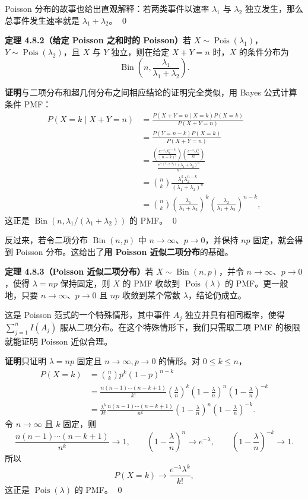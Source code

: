 \documentclass[UTF8,12pt,a4paper,fontset=fandol]{ctexart}
\begin{document}
Poisson 分布的故事也给出直观解释：若两类事件以速率 $\lambda_1$ 与 $\lambda_2$ 独立发生，那么总事件发生速率就是 $\lambda_1+\lambda_2$。 \qed

\noindent\textbf{定理 4.8.2（给定 Poisson 之和时的 Poisson）}\quad 若 $X\sim\operatorname{Pois}(\lambda_1)$，$Y\sim\operatorname{Pois}(\lambda_2)$，且 $X$ 与 $Y$ 独立，则在给定 $X+Y=n$ 时，$X$ 的条件分布为
\[
  \operatorname{Bin}\left(n,\frac{\lambda_1}{\lambda_1+\lambda_2}\right).
\]

\noindent\textbf{证明}\quad 与二项分布和超几何分布之间相应结论的证明完全类似，用 Bayes 公式计算条件 PMF：
\[
\begin{aligned}
  P(X=k\mid X+Y=n)
  &=\frac{P(X+Y=n\mid X=k)P(X=k)}{P(X+Y=n)}\\
  &=\frac{P(Y=n-k)P(X=k)}{P(X+Y=n)}\\
  &=\frac{\left(\frac{e^{-\lambda_2}\lambda_2^{n-k}}{(n-k)!}\right)
    \left(\frac{e^{-\lambda_1}\lambda_1^k}{k!}\right)}
    {\frac{e^{-(\lambda_1+\lambda_2)}(\lambda_1+\lambda_2)^n}{n!}}\\
  &=\binom{n}{k}\frac{\lambda_1^k\lambda_2^{n-k}}{(\lambda_1+\lambda_2)^n}\\
  &=\binom{n}{k}
    \left(\frac{\lambda_1}{\lambda_1+\lambda_2}\right)^k
    \left(\frac{\lambda_2}{\lambda_1+\lambda_2}\right)^{n-k},
\end{aligned}
\]
这正是 $\operatorname{Bin}(n,\lambda_1/(\lambda_1+\lambda_2))$ 的 PMF。 \qed

反过来，若令二项分布 $\operatorname{Bin}(n,p)$ 中 $n\to\infty$、$p\to 0$，并保持 $np$ 固定，就会得到 Poisson 分布。这给出了\textbf{用 Poisson 近似二项分布}的基础。

\noindent\textbf{定理 4.8.3（Poisson 近似二项分布）}\quad 若 $X\sim\operatorname{Bin}(n,p)$，并令 $n\to\infty$、$p\to 0$，使得 $\lambda=np$ 保持固定，则 $X$ 的 PMF 收敛到 $\operatorname{Pois}(\lambda)$ 的 PMF。更一般地，只要 $n\to\infty$、$p\to 0$ 且 $np$ 收敛到某个常数 $\lambda$，结论仍成立。

这是 Poisson 范式的一个特殊情形，其中事件 $A_j$ 独立并具有相同概率，使得 $\sum_{j=1}^n I(A_j)$ 服从二项分布。在这个特殊情形下，我们只需取二项 PMF 的极限就能证明 Poisson 近似合理。

\noindent\textbf{证明}\quad 只证明 $\lambda=np$ 固定且 $n\to\infty,p\to 0$ 的情形。对 $0\le k\le n$，
\[
\begin{aligned}
  P(X=k)
  &=\binom{n}{k}p^k(1-p)^{n-k}\\
  &=\frac{n(n-1)\cdots(n-k+1)}{k!}
    \left(\frac{\lambda}{n}\right)^k
    \left(1-\frac{\lambda}{n}\right)^n
    \left(1-\frac{\lambda}{n}\right)^{-k}\\
  &=\frac{\lambda^k}{k!}
    \frac{n(n-1)\cdots(n-k+1)}{n^k}
    \left(1-\frac{\lambda}{n}\right)^n
    \left(1-\frac{\lambda}{n}\right)^{-k}.
\end{aligned}
\]
令 $n\to\infty$ 且 $k$ 固定，则
\[
  \frac{n(n-1)\cdots(n-k+1)}{n^k}\to 1,\qquad
  \left(1-\frac{\lambda}{n}\right)^n\to e^{-\lambda},\qquad
  \left(1-\frac{\lambda}{n}\right)^{-k}\to 1.
\]
所以
\[
  P(X=k)\to \frac{e^{-\lambda}\lambda^k}{k!},
\]
这正是 $\operatorname{Pois}(\lambda)$ 的 PMF。 \qed
\end{document}
